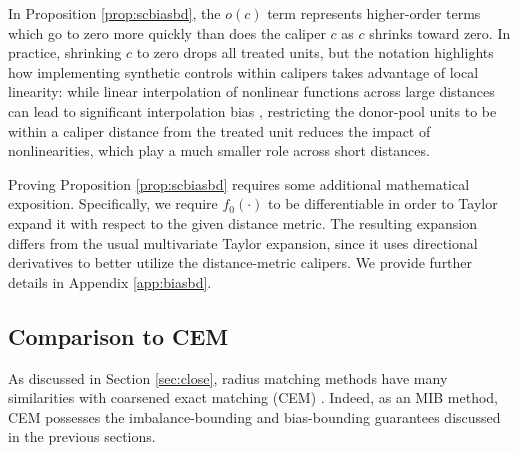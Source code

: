 \documentclass{article}
\begin{document}
In Proposition \ref{prop:scbiasbd}, the $o(c)$ term represents higher-order terms which go to zero more quickly than does the caliper $c$ as $c$ shrinks toward zero.
In practice, shrinking $c$ to zero drops all treated units, but the notation highlights how implementing synthetic controls within calipers takes advantage of local linearity:
while linear interpolation of nonlinear functions across large distances can lead to significant interpolation bias \citep{kellogg2021combining},
restricting the donor-pool units to be within a caliper distance from the treated unit reduces the impact of nonlinearities, which play a much smaller role across short distances.

Proving Proposition \ref{prop:scbiasbd} requires some additional mathematical exposition.
Specifically, we require $f_0(\cdot)$ to be differentiable in order to Taylor expand it with respect to the given distance metric.
The resulting expansion differs from the usual multivariate Taylor expansion, since it uses directional derivatives to better utilize the distance-metric calipers.
We provide further details in Appendix \ref{app:biasbd}.


\subsection{Comparison to CEM}
\label{sec:compCEM}

As discussed in Section \ref{sec:close}, radius matching methods have many similarities with coarsened exact matching (CEM) \citep{iacus2012causal}.
Indeed, as an MIB method, CEM possesses the imbalance-bounding and bias-bounding guarantees discussed in the previous sections.
\end{document}
